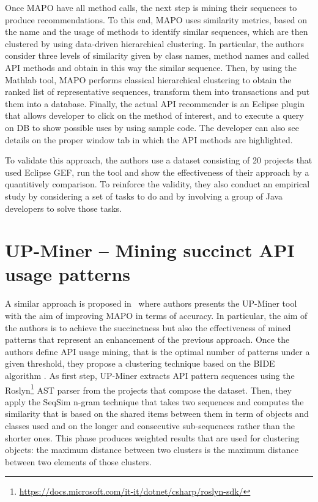 Once MAPO have all method calls, the next 
step is mining their sequences to 
produce recommendations. To this end, 
%
MAPO uses similarity metrics, based on the 
name and the usage of methods to 
identify similar sequences, which are then 
clustered by using data-driven 
hierarchical clustering. In particular, the 
authors consider three levels of 
similarity given by class names, method 
names and called API methods and obtain 
in this way the similar sequence. Then, by 
using the Mathlab tool, MAPO 
performs classical hierarchical clustering 
to obtain the ranked list of 
representative sequences, transform them 
into transactions and put them into a 
database. Finally, the actual API 
recommender is an Eclipse plugin that 
allows 
developer to click on the method of 
interest, and to execute a query on DB to 
show possible uses by using sample code. 
The developer can also see details on 
the proper window tab in which the API 
methods are highlighted.

To validate this approach, the authors use 
a dataset consisting of 20 projects 
that used Eclipse GEF, run the tool and 
show the effectiveness of their 
approach by a quantitively comparison. To 
reinforce the validity, they also 
conduct an empirical study by considering a 
set of tasks to do and by involving 
a group of Java developers to solve those 
tasks.


\section{UP-Miner -- Mining succinct API 
usage patterns}

A similar approach is proposed 
in~\cite{wang_mining_2013} where authors 
presents the UP-Miner tool with the aim of 
improving MAPO in terms of accuracy. 
In particular, the aim of the authors is to 
achieve the succinctness but also 
the effectiveness of mined patterns that 
represent an enhancement of the 
previous  approach. Once the authors define 
API usage mining, that is the 
optimal number of patterns under a given 
threshold, they propose a clustering 
technique based on the BIDE algorithm 
\cite{BIDE}. As first step, UP-Miner 
extracts API pattern sequences using the 
Roslyn\footnote{\url{https://docs.microsoft.com/it-it/dotnet/csharp/roslyn-sdk/}}
 AST parser from the projects that compose 
 the dataset. Then, they apply the 
SeqSim n-gram technique that takes two 
sequences and  computes the similarity 
that is based on the shared items between 
them in term of objects and classes 
used and on the longer and consecutive 
sub-sequences rather than the shorter 
ones. This phase produces weighted results 
that are used for clustering 
objects: the maximum distance between two 
clusters is the maximum distance 
between two elements of those clusters.

